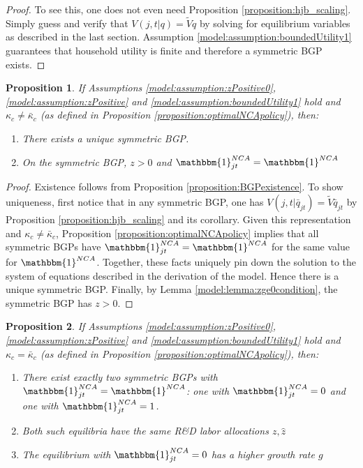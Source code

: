 \documentclass[11pt,english]{article}
\newtheorem{proposition}{Proposition}
\begin{document}
\begin{proof}
	To see this, one does not even need Proposition \ref{proposition:hjb_scaling}. Simply guess and verify that $V(j,t|q) = \tilde{V} q$ by solving for equilibrium variables as described in the last section. Assumption \ref{model:assumption:boundedUtility1} guarantees that household utility is finite and therefore a symmetric BGP exists.
\end{proof}

\begin{proposition}\label{proposition:purstrategyeq:positiveOI}
	If Assumptions \ref{model:assumption:zPositive0}, \ref{model:assumption:zPositive} and \ref{model:assumption:boundedUtility1} hold and $\kappa_c \ne \bar{\kappa}_c$ (as defined in Proposition \ref{proposition:optimalNCApolicy}), then:
	\begin{enumerate}
		\item There exists a unique symmetric BGP.
		\item On the symmetric BGP, $z > 0$ and $\mathbbm{1}^{NCA}_{jt} = \mathbbm{1}^{NCA}$
	\end{enumerate}
\end{proposition}

\begin{proof}
	Existence follows from Proposition \ref{proposition:BGPexistence}. To show uniqueness, first notice that in any symmetric BGP, one has $V(j,t|\bar{q}_{jt}) = \tilde{V}\bar{q}_{jt}$ by Proposition \ref{proposition:hjb_scaling} and its corollary. Given this representation and $\kappa_c \ne \bar{\kappa}_c$, Proposition \ref{proposition:optimalNCApolicy} implies that all symmetric BGPs have $\mathbbm{1}^{NCA}_{jt} = \mathbbm{1}^{NCA}$ for the same value for $\mathbbm{1}^{NCA}$. Together, these facts uniquely pin down the solution to the system of equations described in the derivation of the model. Hence there is a unique symmetric BGP. Finally, by Lemma \ref{model:lemma:zge0condition}, the symmetric BGP has $z > 0$. 
\end{proof}

\begin{proposition}\label{proposition:purestrategyeq:incumbents_indifferent}
	If Assumptions \ref{model:assumption:zPositive0}, \ref{model:assumption:zPositive} and \ref{model:assumption:boundedUtility1} hold and $\kappa_c = \bar{\kappa}_c$ (as defined in Proposition \ref{proposition:optimalNCApolicy}), then:
	\begin{enumerate}
		\item There exist exactly two symmetric BGPs with $\mathbbm{1}^{NCA}_{jt} = \mathbbm{1}^{NCA}$: one with $\mathbbm{1}^{NCA}_{jt} = 0$ and one with $\mathbbm{1}^{NCA}_{jt} = 1$.
		\item Both such equilibria have the same R\&D labor allocations $z, \hat{z}$
		\item The equilibrium with $\mathbbm{1}^{NCA}_{jt} = 0$ has a higher growth rate $g$ 
	\end{enumerate} 
\end{proposition}
\end{document}
